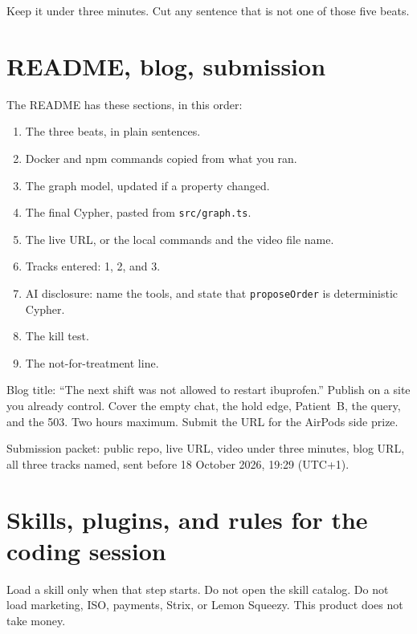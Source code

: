 \documentclass[11pt,a4paper]{article}
\newcommand{\code}[1]{\texttt{#1}}
\newcommand{\file}[1]{\texttt{#1}}
\begin{document}
Keep it under three minutes. Cut any sentence that is not one of those five beats.

\section{README, blog, submission}

The README has these sections, in this order:

\begin{enumerate}
  \item The three beats, in plain sentences.
  \item Docker and npm commands copied from what you ran.
  \item The graph model, updated if a property changed.
  \item The final Cypher, pasted from \file{src/graph.ts}.
  \item The live URL, or the local commands and the video file name.
  \item Tracks entered: 1, 2, and 3.
  \item AI disclosure: name the tools, and state that \code{proposeOrder} is deterministic Cypher.
  \item The kill test.
  \item The not-for-treatment line.
\end{enumerate}

Blog title: ``The next shift was not allowed to restart ibuprofen.''
Publish on a site you already control. Cover the empty chat, the hold edge, Patient~B, the query, and the 503. Two hours maximum. Submit the URL for the AirPods side prize.

Submission packet: public repo, live URL, video under three minutes, blog URL, all three tracks named, sent before 18 October 2026, 19:29 (UTC+1).

\section{Skills, plugins, and rules for the coding session}

Load a skill only when that step starts. Do not open the skill catalog. Do not load marketing, ISO, payments, Strix, or Lemon Squeezy. This product does not take money.
\end{document}
